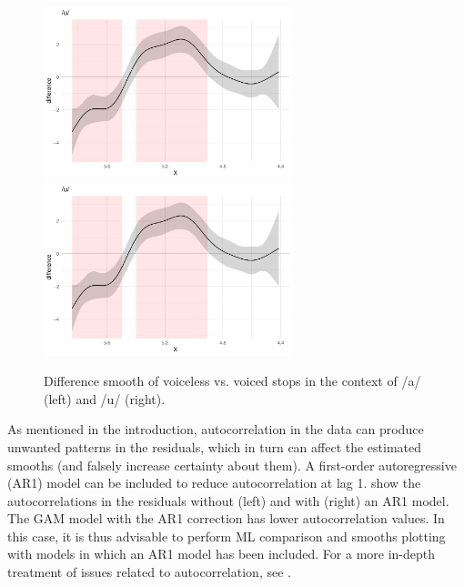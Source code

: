 \documentclass[11pt,]{article}
\begin{document}
\begin{figure}

{\centering \includegraphics[width=.7\linewidth,height=5cm]{2018-polar-gam_files/figure-latex/Figure05} \includegraphics[width=.7\linewidth,height=5cm]{2018-polar-gam_files/figure-latex/Figure05} 

}

\caption{Difference smooth of voiceless vs. voiced stops in the context of /a/ (left) and /u/ (right).}\label{f:Figure05}
\end{figure}

As mentioned in the introduction, autocorrelation in the data can
produce unwanted patterns in the residuals, which in turn can affect the
estimated smooths (and falsely increase certainty about them). A
first-order autoregressive (AR1) model can be included to reduce
autocorrelation at lag 1.  show the autocorrelations in
the residuals without (left) and with (right) an AR1 model. The GAM
model with the AR1 correction has lower autocorrelation values. In this
case, it is thus advisable to perform ML comparison and smooths plotting
with models in which an AR1 model has been included. For a more in-depth
treatment of issues related to autocorrelation, see
\citet{soskuthy2017}.
\end{document}
